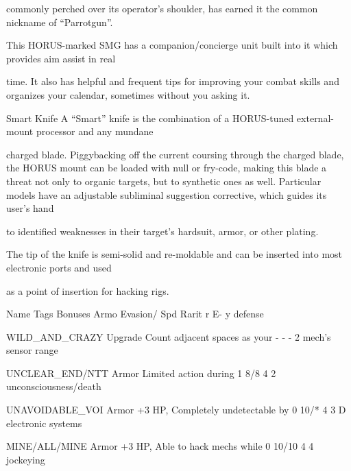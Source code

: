 commonly perched over its operator’s shoulder, has earned it the common nickname of “Parrotgun”.  

This HORUS-marked SMG has a companion/concierge unit built into it which provides aim assist in real  

time. It also has helpful and frequent tips for improving your combat skills and organizes your calendar,  
sometimes without you asking it.
 

Smart Knife  
A “Smart” knife is the combination of a HORUS-tuned external-mount processor and any mundane  

charged blade. Piggybacking off the current coursing through the charged blade, the HORUS mount can  
be loaded with null or fry-code, making this blade a threat not only to organic targets, but to synthetic ones  
as well. Particular models have an adjustable subliminal suggestion corrective, which guides its user’s hand  

to identified weaknesses in their target’s hardsuit, armor, or other plating.   

The tip of the knife is semi-solid and re-moldable and can be inserted into most electronic ports and used  

as a point of insertion for hacking rigs.
 

  Name                     Tags        Bonuses                                 Armo     Evasion/     Spd    Rarit 
                                                                                r       E-                 y 
                                                                                        defense 

  WILD\_AND\_CRAZY           Upgrade     Count adjacent spaces as your            -       -            -      2 
                                       mech’s sensor range 

 UNCLEAR\_END/NTT          Armor        Limited action during                    1       8/8          4      2 
                                       unconsciousness/death 

                                                                                                                


 UNAVOIDABLE\_VOI           Armor       +3 HP, Completely undetectable by        0        10/*         4     3 
 D                                     electronic systems 

 MINE/ALL/MINE             Armor       +3 HP, Able to hack mechs while          0        10/10        4     4 
                                       jockeying 

